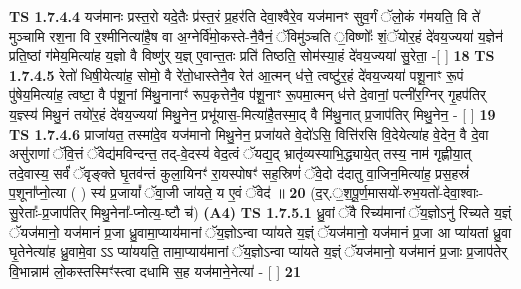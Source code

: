 \documentclass[17pt]{extarticle}
\begin{document}
                  \newline
                                \textbf{ TS 1.7.4.4} \newline
                  यज॑मानः प्रस्त॒रो यदे॒तैः प्र॑स्त॒रं प्र॒हर॑ति देवा॒श्वैरे॒व यज॑मानꣳ सुव॒र्गं ॅलो॒कं ग॑मयति॒ वि ते॑ मुञ्चामि रश॒ना वि र॒श्मीनित्या॑है॒ष वा अ॒ग्नेर्वि॑मो॒कस्ते-नै॒वैनं॒ ॅविमु॑ञ्चति ॒विष्णोः᳚ शं॒ॅयोर॒हं दे॑वय॒ज्यया॑ य॒ज्ञेन॑ प्रति॒ष्ठां ग॑मेय॒मित्या॑ह य॒ज्ञो वै विष्णु॑र् य॒ज्ञ् ए॒वान्त॒तः प्रति॑ तिष्ठति॒ सोम॑स्या॒हं दे॑वय॒ज्यया॑ सु॒रेता॒ -[ ] \textbf{  18} \newline
                  \newline
                                \textbf{ TS 1.7.4.5} \newline
                  रेतो॑ धिषी॒येत्या॑ह॒ सोमो॒ वै रे॑तो॒धास्तेनै॒व रेत॑ आ॒त्मन् ध॑त्ते॒ त्वष्टु॑र॒हं दे॑वय॒ज्यया॑ पशू॒नाꣳ रू॒पं पु॑षेय॒मित्या॑ह॒ त्वष्टा॒ वै प॑शू॒नां मि॑थु॒नानाꣳ॑ रूप॒कृत्तेनै॒व प॑शू॒नाꣳ रू॒पमा॒त्मन् ध॑त्ते दे॒वानां॒ पत्नी॑र॒ग्निर् गृ॒हप॑तिर् य॒ज्ञ्स्य॑ मिथु॒नं तयो॑र॒हं दे॑वय॒ज्यया॑ मिथु॒नेन॒ प्रभू॑यास॒-मित्या॑है॒तस्मा॒द् वै मि॑थु॒नात् प्र॒जाप॑तिर् मिथु॒नेन॒ - [ ] \textbf{  19} \newline
                  \newline
                                \textbf{ TS 1.7.4.6} \newline
                  प्राजा॑यत॒ तस्मा॑दे॒व यज॑मानो मिथु॒नेन॒ प्रजा॑यते वे॒दो॑ऽसि॒ वित्ति॑रसि वि॒देयेत्या॑ह वे॒देन॒ वै दे॒वा असु॑राणां ॅवि॒त्तं ॅवेद्य॑मविन्दन्त॒ तद्-वे॒दस्य॑ वेद॒त्वं ॅयद्य॒द् भ्रातृ॑व्यस्याभि॒द्ध्याये॒त् तस्य॒ नाम॑ गृह्णीया॒त् तदे॒वास्य॒ सर्वं॑ ॅवृङ्क्ते घृ॒तव॑न्तं कुला॒यिनꣳ॑ रा॒यस्पोषꣳ॑ सह॒स्रिणं॑ ॅवे॒दो द॑दातु वा॒जिन॒मित्या॑ह॒ प्रस॒हस्रं॑ प॒शूना᳚प्नो॒त्या ( ) स्य॑ प्र॒जायां᳚ ॅवा॒जी जा॑यते॒ य ए॒वं ॅवेद॑ ॥ \textbf{  20} \newline
                  \newline
                       (द॒र्.॒श॒पू॒र्ण॒मासयो॑-रुभ॒यतो॑-देवा॒श्वाः-सु॒रेताः᳚-प्र॒जाप॑तिर् मिथु॒नेना᳚-प्नोत्य॒-ष्टौ च॑)  \textbf{(A4)} \newline \newline
                                        \textbf{ TS 1.7.5.1} \newline
                  ध्रु॒वां ॅवै रिच्य॑मानां ॅय॒ज्ञोऽनु॑ रिच्यते य॒ज्ञ्ं ॅयज॑मानो॒ यज॑मानं प्र॒जा ध्रु॒वामा॒प्याय॑मानां ॅय॒ज्ञोऽन्वा प्या॑यते य॒ज्ञ्ं ॅयज॑मानो॒ यज॑मानं प्र॒जा आ प्या॑यतां ध्रु॒वा घृ॒तेनेत्या॑ह ध्रु॒वामे॒वा ऽऽ प्या॑ययति॒ तामा॒प्याय॑मानां ॅय॒ज्ञोऽन्वा प्या॑यते य॒ज्ञ्ं ॅयज॑मानो॒ यज॑मानं प्र॒जाः प्र॒जाप॑तेर् वि॒भान्नाम॑ लो॒कस्तस्मिꣳ॑स्त्वा दधामि स॒ह यज॑माने॒नेत्या॑ - [ ] \textbf{  21} \newline
\end{document}
